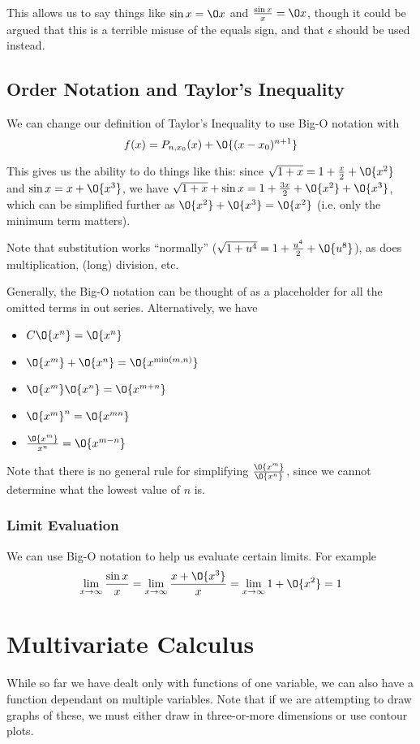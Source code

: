 \documentclass[12pt]{article}
\begin{document}
This allows us to say things like $\sin x = \O x$ and $\frac{\sin x}{x} = \O x$, though it could be argued that this is a terrible misuse of the equals sign, and that $\epsilon$ should be used instead.

\subsection*{Order Notation and Taylor's Inequality}
We can change our definition of Taylor's Inequality to use Big-O notation with \[ f(x) = P_{n,x_0} (x) + \O{(x-x_0)^{n+1}} \]

This gives us the ability to do things like this: since $\sqrt{1 + x} = 1 + \frac{x}{2} + \O{x^2}$ and $\sin x = x + \O{x^3}$, we have $\sqrt{1+x} + \sin x = 1 + \frac{3x}{2} + \O{x^2} + \O{x^3}$, which can be simplified further as $\O{x^2} + \O{x^3} = \O{x^2}$ (i.e. only the minimum term matters).

Note that substitution works ``normally'' ($\sqrt{1 + u^4} = 1 + \frac{u^4}{2} + \O{u^8}$), as does multiplication, (long) division, etc.

Generally, the Big-O notation can be thought of as a placeholder for all the omitted terms in out series. Alternatively, we have
\begin{itemize}
\item $C \O{x^n} = \O{x^n}$
\item $\O{x^m} + \O{x^n} = \O{x^{\min(m,n)}}$
\item $\O{x^m} \O{x^n} = \O{x^{m+n}}$
\item $\O{x^m}^n = \O{x^{mn}}$
\item $\frac{\O{x^m}}{x^n} = \O{x^{m-n}}$
\end{itemize}
Note that there is no general rule for simplifying $\frac{\O{x^m}}{\O{x^n}}$, since we cannot determine what the lowest value of $n$ is.

\subsubsection*{Limit Evaluation}
We can use Big-O notation to help us evaluate certain limits. For example \[ \lim_{x\to\infty} \frac{\sin x}{x} = \lim_{x\to\infty} \frac{x+\O{x^3}}{x} = \lim_{x\to\infty} 1 + \O{x^2} = 1 \]

\section*{Multivariate Calculus}
While so far we have dealt only with functions of one variable, we can also have a function dependant on multiple variables. Note that if we are attempting to draw graphs of these, we must either draw in three-or-more dimensions or use contour plots.
\end{document}
